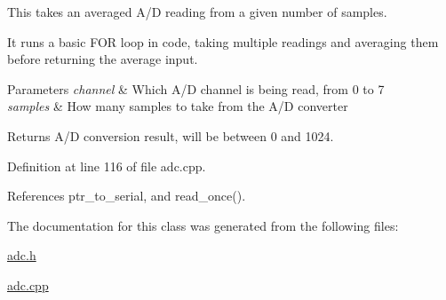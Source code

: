 This takes an averaged A/D reading from a given number of samples. 

It runs a basic F\+OR loop in code, taking multiple readings and averaging them before returning the average input. 
\begin{DoxyParams}{Parameters}
{\em channel} & Which A/D channel is being read, from 0 to 7 \\
\hline
{\em samples} & How many samples to take from the A/D converter \\
\hline
\end{DoxyParams}
\begin{DoxyReturn}{Returns}
A/D conversion result, will be between 0 and 1024. 
\end{DoxyReturn}


Definition at line 116 of file adc.\+cpp.



References ptr\+\_\+to\+\_\+serial, and read\+\_\+once().



The documentation for this class was generated from the following files\+:\begin{DoxyCompactItemize}
\item 
\hyperlink{adc_8h}{adc.\+h}\item 
\hyperlink{adc_8cpp}{adc.\+cpp}\end{DoxyCompactItemize}
